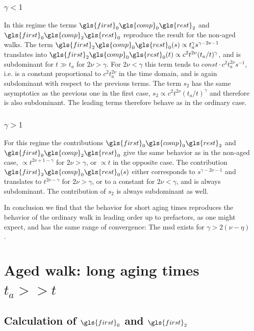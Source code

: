 \subsubsection{$\gamma<1$}
In this regime the terms $\gls{first}_0\gls{comp}_0 \gls{rest}_2 $ and $ \gls{first}_0\gls{comp}_2 \gls{rest}_0$ reproduce the result for the non-aged walks. The term $\gls{first}_2\gls{comp}_0 \gls{rest}_0 (s)  \propto t_a^\gamma s^{\gamma-2\nu -1}$
translates into $\gls{first}_2\gls{comp}_0 \gls{rest}_0 (t) \propto c^2 t^{2\nu}(t_a/t)^\gamma$, and is subdominant for $t \gg t_a$ for $2\nu > \gamma$. For $2\nu < \gamma$ this term tends to $const \cdot  c^2 t_a^{2\nu}s^{-1}$, i.e. is a constant proportional to $c^2 t_a^{2\nu}$ in the time domain, and is again subdominant with respect to the previous terms.
The term $s_2$ has the same asymptotics as the previous one in the first case, $s_2 \propto c^2 t^{2\nu}(t_a/t)^\gamma$ and therefore is also subdominant. The leading terms  therefore behave as in the ordinary case.

\subsubsection{$\gamma>1$}
For this regime the contributions $\gls{first}_0\gls{comp}_0 \gls{rest}_2 $ and $\gls{first}_0\gls{comp}_2 \gls{rest}_0 $ give the same behavior as in the non-aged case, $\propto t^{2\nu +1- \gamma }$ for $2\nu > \gamma$,
or  $\propto t$ in the opposite case. The contribution $\gls{first}_2\gls{comp}_0 \gls{rest}_0 (s)$ either corresponds to $s^{\gamma-2\nu -1}$ and translates to $t^{2\nu - \gamma}$ for $2\nu > \gamma$, or to a constant for $2\nu < \gamma$, and is always subdominant. The contribution of $s_2$ is always subdominant as well. 

In conclusion we find that the behavior for short aging times reproduces the behavior of the ordinary walk in leading order up to prefactors, as one might expect, and has the same range of convergence: The \gls{msd} exists for $\gamma > 2(\nu-\eta)$.


\section{Aged walk: long aging times $t_a >> t$ }
\label{sec:considerably}

\subsection*{Calculation of $\gls{first}_0$ and $\gls{first}_2$}

